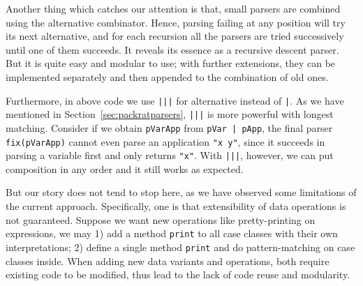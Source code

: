 Another thing which catches our attention is that, small parsers are combined using the alternative combinator. Hence, parsing failing at any position will try its next alternative, and for each recursion all the parsers are tried successively until one of them succeeds. It reveals its essence as a recursive descent parser. But it is quite easy and modular to use; with further extensions, they can be implemented separately and then appended to the combination of old ones.

Furthermore, in above code we use \lstinline{|||} for alternative instead of \lstinline{|}. As we have mentioned in Section~\ref{sec:packratparsers}, \lstinline{|||} is more powerful with longest matching. Consider if we obtain \lstinline{pVarApp} from \lstinline{pVar | pApp}, the final parser \lstinline{fix(pVarApp)} cannot even parse an application \lstinline{"x y"}, since it succeeds in parsing a variable first and only returns \lstinline{"x"}. With \lstinline{|||}, however, we can put composition in any order and it still works as expected.

But our story does not tend to stop here, as we have observed some limitations of the current approach. Specifically, one is that extensibility of data operations is not guaranteed. Suppose we want new operations like pretty-printing on expressions, we may 1) add a method \lstinline{print} to all case classes with their own interpretations; 2) define a single method \lstinline{print} and do pattern-matching on case classes inside. When adding new data variants and operations, both require existing code to be modified, thus lead to the lack of code reuse and modularity.

